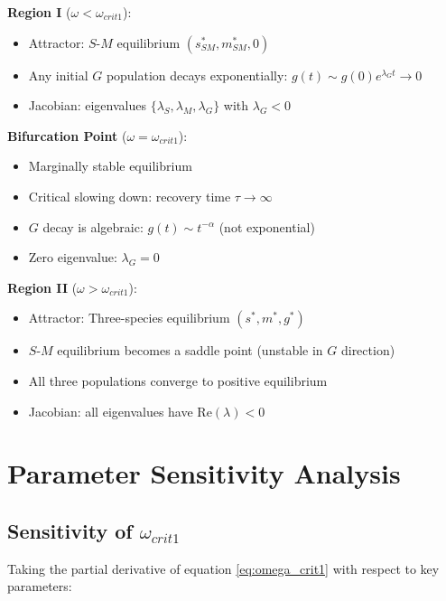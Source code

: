 \documentclass[11pt]{article}
\begin{document}
\textbf{Region I} ($\omega < \omega_{crit1}$):
\begin{itemize}
    \item Attractor: $S$-$M$ equilibrium $(s^*_{SM}, m^*_{SM}, 0)$
    \item Any initial $G$ population decays exponentially: $g(t) \sim g(0) e^{\lambda_G t} \to 0$
    \item Jacobian: eigenvalues $\{\lambda_{S}, \lambda_M, \lambda_G\}$ with $\lambda_G < 0$
\end{itemize}

\textbf{Bifurcation Point} ($\omega = \omega_{crit1}$):
\begin{itemize}
    \item Marginally stable equilibrium
    \item Critical slowing down: recovery time $\tau \to \infty$
    \item $G$ decay is algebraic: $g(t) \sim t^{-\alpha}$ (not exponential)
    \item Zero eigenvalue: $\lambda_G = 0$
\end{itemize}

\textbf{Region II} ($\omega > \omega_{crit1}$):
\begin{itemize}
    \item Attractor: Three-species equilibrium $(s^*, m^*, g^*)$
    \item $S$-$M$ equilibrium becomes a saddle point (unstable in $G$ direction)
    \item All three populations converge to positive equilibrium
    \item Jacobian: all eigenvalues have $\text{Re}(\lambda) < 0$
\end{itemize}

\section{Parameter Sensitivity Analysis}

\subsection{Sensitivity of $\omega_{crit1}$}

Taking the partial derivative of equation \eqref{eq:omega_crit1} with respect to key parameters:
\end{document}
